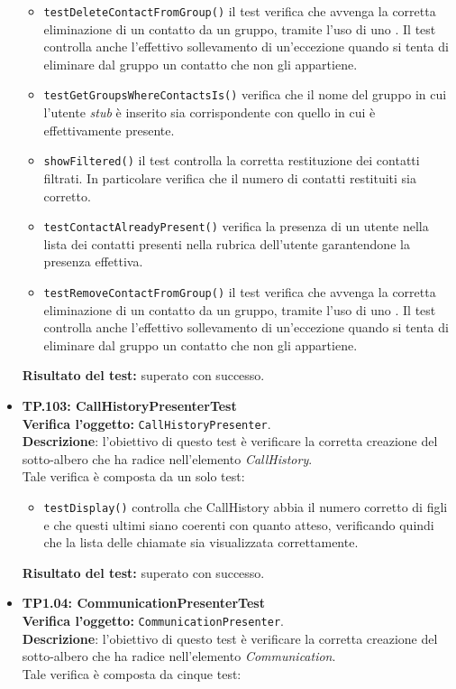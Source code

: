 \begin{itemize}
\begin{itemize}
\item \texttt{testDeleteContactFromGroup()} il test verifica che avvenga la corretta eliminazione di un contatto da un gruppo, tramite l'uso di uno . Il test controlla anche l'effettivo sollevamento di un'eccezione quando si tenta di eliminare dal gruppo un contatto che non gli appartiene.
\item \texttt{testGetGroupsWhereContactsIs()} verifica che il nome del gruppo in cui l'utente \textit{stub} è inserito sia corrispondente con quello in cui è effettivamente presente.
\item \texttt{showFiltered()} il test controlla la corretta restituzione dei contatti filtrati. In particolare verifica che il numero di contatti restituiti sia corretto.
\item \texttt{testContactAlreadyPresent()} verifica la presenza di un utente nella lista dei contatti presenti nella rubrica dell'utente garantendone la presenza effettiva.
\item \texttt{testRemoveContactFromGroup()} il test verifica che avvenga la corretta eliminazione di un contatto da un gruppo, tramite l'uso di uno . Il test controlla anche l'effettivo sollevamento di un'eccezione quando si tenta di eliminare dal gruppo un contatto che non gli appartiene.
\end{itemize}
\textbf{Risultato del test:} superato con successo.

\item \textbf{TP.103: CallHistoryPresenterTest}\\
\textbf{Verifica l'oggetto:} \texttt{CallHistoryPresenter}.\\
\textbf{Descrizione}: l'obiettivo di questo test è verificare la corretta creazione del sotto-albero che ha radice nell'elemento \textit{CallHistory}.\\
Tale verifica è composta da un solo test:
\begin{itemize}

\item \texttt{testDisplay()} controlla che CallHistory abbia il numero corretto di figli e  che questi ultimi siano coerenti con quanto atteso, verificando quindi che la lista delle chiamate sia visualizzata correttamente.

\end{itemize}
\textbf{Risultato del test:} superato con successo.

\item \textbf{TP1.04: CommunicationPresenterTest}\\ %
\textbf{Verifica l'oggetto:} \texttt{CommunicationPresenter}.\\
\textbf{Descrizione}: l'obiettivo di questo test è verificare la corretta creazione del sotto-albero che ha radice nell'elemento \textit{Communication}.\\
Tale verifica è composta da cinque test:
\begin{itemize}


\end{itemize}
\end{itemize}
